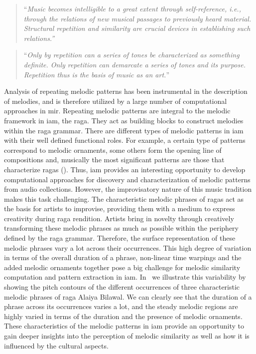 \blockcquote[]{Cambouropoulos2006}{``\textit{Music becomes intelligible to a great extent through self-reference, i.e., through the relations of new musical passages to previously heard material. Structural repetition and similarity are crucial devices in establishing such relations.''}}

\blockcquote[]{schenker1980harmony}{``\textit{Only by repetition can a series of tones be characterized as something definite. Only repetition can demarcate a series of tones and its purpose. Repetition thus is the basis of music as an art.}''}

Analysis of repeating melodic patterns has been instrumental in the description of melodies, and is therefore utilized by a large number of computational approaches in \gls{mir}. Repeating melodic patterns are integral to the melodic framework in \gls{iam}, the \gls{raga}. They act as building blocks to construct melodies within the \gls{raga} grammar. There are different types of melodic patterns in \gls{iam} with their well defined functional roles. For example, a certain type of patterns correspond to melodic ornaments, some others form the opening line of compositions and, musically the most significant patterns are those that characterize \glspl{raga} (). Thus, \gls{iam} provides an interesting opportunity to develop computational approaches for discovery and characterization of melodic patterns from audio collections. However, the improvisatory nature of this music tradition makes this task challenging. The characteristic melodic phrases of \glspl{raga} act as the basis for artists to improvise, providing them with a medium to express creativity during \gls{raga} rendition. Artists bring in novelty through creatively transforming these melodic phrases as much as possible within the periphery defined by the \gls{raga} grammar. Therefore, the surface representation of these melodic phrases vary a lot across their occurrences. This high degree of variation in terms of the overall duration of a phrase, non-linear time warpings and the added melodic ornaments together pose a big challenge for melodic similarity computation and pattern extraction in \gls{iam}. In~ we illustrate this variability by showing the pitch contours of the different occurrences of three characteristic melodic phrases of \gls{raga} Alaiya Bilawal. We can clearly see that the duration of a phrase across its occurrences varies a lot, and the steady melodic regions are highly varied in terms of the duration and the presence of melodic ornaments. These characteristics of the melodic patterns in \gls{iam} provide an opportunity to gain deeper insights into the perception of melodic similarity as well as how it is influenced by the cultural aspects. 

